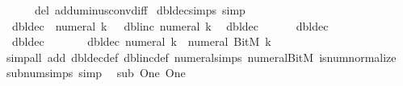 \begin{isabellebody}
\ \ \ \ \ \ del{\isacharcolon}{\kern0pt}\ add{\isacharunderscore}{\kern0pt}uminus{\isacharunderscore}{\kern0pt}conv{\isacharunderscore}{\kern0pt}diff{\isacharparenright}{\kern0pt}%
\endisatagproof
{\isafoldproof}%
%
\isadelimproof
\isanewline
%
\endisadelimproof
\isanewline
{}\isamarkupfalse%
\ dbl{\isacharunderscore}{\kern0pt}dec{\isacharunderscore}{\kern0pt}simps\ {\isacharbrackleft}{\kern0pt}simp{\isacharbrackright}{\kern0pt}{\isacharcolon}{\kern0pt}\isanewline
\ \ {\isachardoublequoteopen}dbl{\isacharunderscore}{\kern0pt}dec\ {\isacharparenleft}{\kern0pt}{\isacharminus}{\kern0pt}\ numeral\ k{\isacharparenright}{\kern0pt}\ {\isacharequal}{\kern0pt}\ {\isacharminus}{\kern0pt}\ dbl{\isacharunderscore}{\kern0pt}inc\ {\isacharparenleft}{\kern0pt}numeral\ k{\isacharparenright}{\kern0pt}{\isachardoublequoteclose}\isanewline
\ \ {\isachardoublequoteopen}dbl{\isacharunderscore}{\kern0pt}dec\ {}\ {\isacharequal}{\kern0pt}\ {\isacharminus}{\kern0pt}\ {}{\isachardoublequoteclose}\isanewline
\ \ {\isachardoublequoteopen}dbl{\isacharunderscore}{\kern0pt}dec\ {}\ {\isacharequal}{\kern0pt}\ {}{\isachardoublequoteclose}\isanewline
\ \ {\isachardoublequoteopen}dbl{\isacharunderscore}{\kern0pt}dec\ {\isacharparenleft}{\kern0pt}{\isacharminus}{\kern0pt}\ {}{\isacharparenright}{\kern0pt}\ {\isacharequal}{\kern0pt}\ {\isacharminus}{\kern0pt}\ {}{\isachardoublequoteclose}\isanewline
\ \ {\isachardoublequoteopen}dbl{\isacharunderscore}{\kern0pt}dec\ {\isacharparenleft}{\kern0pt}numeral\ k{\isacharparenright}{\kern0pt}\ {\isacharequal}{\kern0pt}\ numeral\ {\isacharparenleft}{\kern0pt}BitM\ k{\isacharparenright}{\kern0pt}{\isachardoublequoteclose}\isanewline
%
\isadelimproof
\ \ %
\endisadelimproof
%
\isatagproof
{}\isamarkupfalse%
\ {\isacharparenleft}{\kern0pt}simp{\isacharunderscore}{\kern0pt}all\ add{\isacharcolon}{\kern0pt}\ dbl{\isacharunderscore}{\kern0pt}dec{\isacharunderscore}{\kern0pt}def\ dbl{\isacharunderscore}{\kern0pt}inc{\isacharunderscore}{\kern0pt}def\ numeral{\isachardot}{\kern0pt}simps\ numeral{\isacharunderscore}{\kern0pt}BitM\ is{\isacharunderscore}{\kern0pt}num{\isacharunderscore}{\kern0pt}normalize{\isacharparenright}{\kern0pt}%
\endisatagproof
{\isafoldproof}%
%
\isadelimproof
\isanewline
%
\endisadelimproof
\isanewline
{}\isamarkupfalse%
\ sub{\isacharunderscore}{\kern0pt}num{\isacharunderscore}{\kern0pt}simps\ {\isacharbrackleft}{\kern0pt}simp{\isacharbrackright}{\kern0pt}{\isacharcolon}{\kern0pt}\isanewline
\ \ {\isachardoublequoteopen}sub\ One\ One\ {\isacharequal}{\kern0pt}\ {}{\isachardoublequoteclose}\isanewline

\end{isabellebody}
